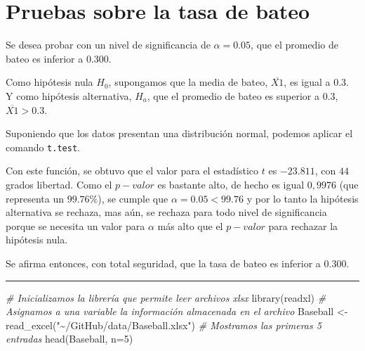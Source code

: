 \documentclass{staprojteamusb}
\newenvironment{Shaded}{\begin{snugshade}}{\end{snugshade}}
\newcommand{\AttributeTok}[1]{\textcolor[rgb]{0.77,0.63,0.00}{#1}}
\newcommand{\CommentTok}[1]{\textcolor[rgb]{0.56,0.35,0.01}{\textit{#1}}}
\newcommand{\DecValTok}[1]{\textcolor[rgb]{0.00,0.00,0.81}{#1}}
\newcommand{\FunctionTok}[1]{\textcolor[rgb]{0.00,0.00,0.00}{#1}}
\newcommand{\NormalTok}[1]{#1}
\newcommand{\OtherTok}[1]{\textcolor[rgb]{0.56,0.35,0.01}{#1}}
\newcommand{\StringTok}[1]{\textcolor[rgb]{0.31,0.60,0.02}{#1}}
\begin{document}
	
	
	\maketitle
	
	
	
	\hypertarget{pruebas-sobre-la-tasa-de-bateo}{%
 \section{Pruebas sobre la tasa de
 bateo}\label{pruebas-sobre-la-tasa-de-bateo}}

 Se desea probar con un nivel de significancia de \(\alpha=0.05\), que
 el promedio de bateo es inferior a \(0.300\).

 Como hipótesis nula \(H_{0}\), supongamos que la media de bateo,
 \(\overline{X1}\), es igual a \(0.3\). Y como hipótesis alternativa,
 \(H_{a}\), que el promedio de bateo es superior a \(0.3\),
 \(\overline{X1}>0.3\).

 Suponiendo que los datos presentan una distribución normal, podemos
 aplicar el comando \texttt{t.test}.

 Con este función, se obtuvo que el valor para el estadístico \(t\) es
 \(-23.811\), con \(44\) grados libertad. Como el \(p-valor\) es
 bastante alto, de hecho es igual \(0,9976\) (que representa un
 \(99.76\%\)), se cumple que \(\alpha=0.05<99.76\) y por lo tanto la
 hipótesis alternativa se rechaza, mas aún, se rechaza para todo nivel
 de significancia porque se necesita un valor para \(\alpha\) más alto
 que el \(p-valor\) para rechazar la hipótesis nula.

 Se afirma entonces, con total seguridad, que la tasa de bateo es
 inferior a \(0.300\).

 \begin{center}\rule{0.5\linewidth}{0.5pt}\end{center}

\begin{Shaded}
\begin{Highlighting}[]
\CommentTok{\# Inicializamos la librería que permite leer archivos xlsx}
\FunctionTok{library}\NormalTok{(readxl)}
\CommentTok{\# Asignamos a una variable la información almacenada en el archivo}
\NormalTok{Baseball }\OtherTok{\textless{}{-}} \FunctionTok{read\_excel}\NormalTok{(}\StringTok{"\textasciitilde{}/GitHub/data/Baseball.xlsx"}\NormalTok{)}
\CommentTok{\# Mostramos las primeras 5 entradas}
\FunctionTok{head}\NormalTok{(Baseball, }\AttributeTok{n=}\DecValTok{5}\NormalTok{)}
\end{Highlighting}
\end{Shaded}
\end{document}
